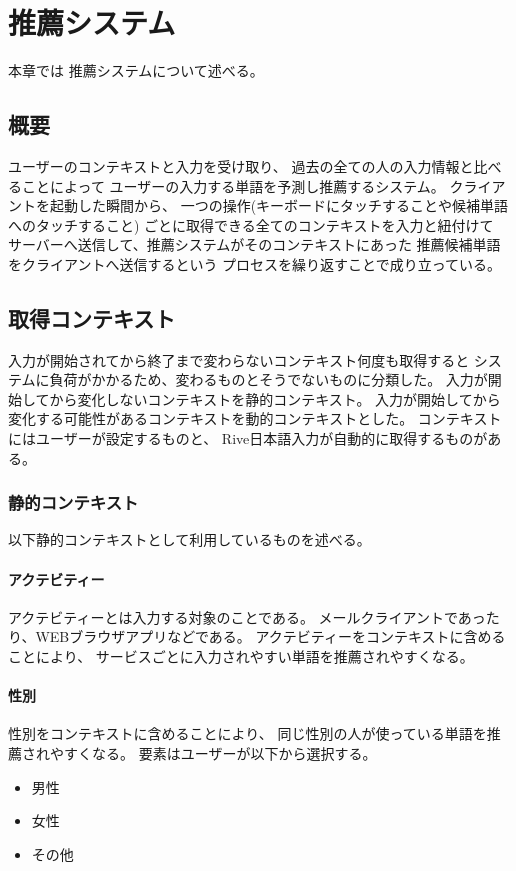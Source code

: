 \chapter{推薦システム}
\label{chap:recommend}
本章では
推薦システムについて述べる。

\newpage
\section{概要}
ユーザーのコンテキストと入力を受け取り、
過去の全ての人の入力情報と比べることによって
ユーザーの入力する単語を予測し推薦するシステム。
クライアントを起動した瞬間から、
一つの操作(キーボードにタッチすることや候補単語へのタッチすること)
ごとに取得できる全てのコンテキストを入力と紐付けて
サーバーへ送信して、推薦システムがそのコンテキストにあった
推薦候補単語をクライアントへ送信するという
プロセスを繰り返すことで成り立っている。

\section{取得コンテキスト}
\label{sec:getcontext}
入力が開始されてから終了まで変わらないコンテキスト何度も取得すると
システムに負荷がかかるため、変わるものとそうでないものに分類した。
入力が開始してから変化しないコンテキストを静的コンテキスト。
入力が開始してから変化する可能性があるコンテキストを動的コンテキストとした。
コンテキストにはユーザーが設定するものと、
Rive日本語入力が自動的に取得するものがある。

\subsection{静的コンテキスト}
\label{staticcontext}
以下静的コンテキストとして利用しているものを述べる。

\subsubsection{アクテビティー}
\label{activity}
アクテビティーとは入力する対象のことである。
メールクライアントであったり、WEBブラウザアプリなどである。
アクテビティーをコンテキストに含めることにより、
サービスごとに入力されやすい単語を推薦されやすくなる。

\subsubsection{性別}
性別をコンテキストに含めることにより、
同じ性別の人が使っている単語を推薦されやすくなる。
要素はユーザーが以下から選択する。
\begin{itemize}
  \item 男性
  \item 女性
  \item その他
\end{itemize}

